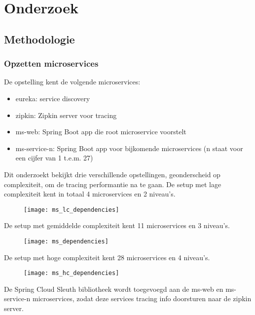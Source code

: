 
\chapter{Onderzoek}
\label{ch:onderzoek}

\section{Methodologie}
\label{sec:methodologie}

\subsection{Opzetten microservices}
\label{sec:opzetten}

De opstelling kent de volgende microservices:
\begin{itemize}
\item eureka: service discovery
\item zipkin: Zipkin server voor tracing
\item ms-web: Spring Boot app die root microservice voorstelt
\item ms-service-n: Spring Boot app voor bijkomende microservices (n staat voor een cijfer van 1 t.e.m. 27)
\end{itemize}

Dit onderzoekt bekijkt drie verschillende opstellingen, geonderscheid op complexiteit, om de tracing performantie na te gaan. De setup met lage complexiteit kent in totaal 4 microservices en 2 niveau's.
\begin{figure}[h]
\texttt{[image: ms\_lc\_dependencies]}
\end{figure}
De setup met gemiddelde complexiteit kent 11 microservices en 3 niveau's.
\begin{figure}[h]
\texttt{[image: ms\_dependencies]}
\end{figure}
De setup met hoge complexiteit kent 28 microservices en 4 niveau's. 
\begin{figure}[h]
\texttt{[image: ms\_hc\_dependencies]}
\end{figure}

De Spring Cloud Sleuth bibliotheek wordt toegevoegd aan de ms-web en ms-service-n microservices, zodat deze services tracing info doorsturen naar de zipkin server.

